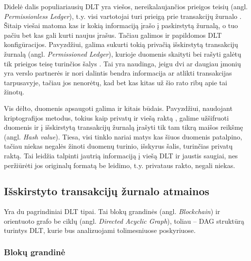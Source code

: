 Didelė dalis populiariausių DLT yra viešos, nereikalaujančios prieigos teisių (angl. \textit{Permissionless Ledger}), t.y. visi vartotojai turi prieigą prie transakcijų žurnalo \cite{olnes2017blockchain}. Šitaip viešai matoma kas ir kokią informaciją įrašo į paskirstytą žurnalą, o tuo pačiu bet kas gali kurti naujus įrašus. Tačiau galimos ir papildomos DLT konfigūracijos. Pavyzdžiui, galima sukurti tokią privačią išskirstytą transakcijų žurnalą (angl. \textit{Permissioned Ledger}), kurioje duomenis skaityti bei rašyti galėtų tik prieigos teisę turinčios šalys \cite{backlund2016technical}. Tai yra naudinga, jeigu dvi ar daugiau įmonių yra verslo partnerės ir nori dalintis bendra informacija ar atlikti transakcijas tarpusavyje, tačiau jos nenorėtų, kad bet kas kitas už šio rato ribų apie tai žinotų. 

Vis dėlto, duomenis apsaugoti galima ir kitais būdais. Pavyzdžiui, naudojant kriptografijos metodus, tokius kaip privatų ir viešą raktą \cite{zyskind2015decentralizing}, galime užšifruoti duomenis ir į išskirstytą transakcijų žurnalą įrašyti tik tam tikrą maišos reikšmę (angl. \textit{Hash value}). Tiesa, visi tinklo nariai matys kas šiuos duomenis patalpino, tačiau niekas negalės žinoti duomenų turinio, išskyrus šalis, turinčias privatų raktą. Tai leidžia talpinti jautrią informaciją į viešą DLT ir jaustis saugiai, nes peržiūrėti jos originalų formatą be leidimo, t.y. privataus rakto, negali niekas.




\subsection{Išskirstyto transakcijų žurnalo atmainos}

Yra du pagrindiniai DLT tipai. Tai blokų grandinės (angl. \textit{Blockchain}) ir orientuoto grafo be ciklų (angl. \textit{Directed Acyclic Graph}), toliau – DAG struktūrą turintys DLT, kurie bus analizuojami tolimesniuose poskyriuose.




\subsubsection{Blokų grandinė}


